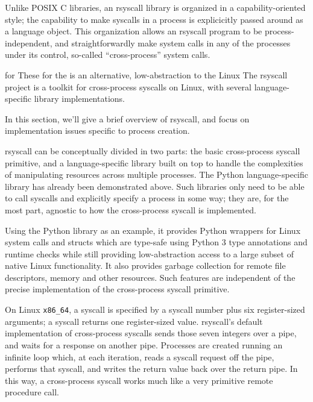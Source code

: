 \documentclass[sigplan]{acmart}
\begin{document}
Unlike POSIX C libraries, an rsyscall library is organized in a capability-oriented style;
the capability to make syscalls in a process is explicicitly passed around as a language object.
This organization allows an rsyscall program to be process-independent,
and straightforwardly make system calls in any of the processes under its control,
so-called ``cross-process'' system calls.

for 
These 
for the is an alternative, low-abstraction to the Linux
The rsyscall project is a toolkit for cross-process syscalls on Linux,
with several language-specific library implementations.

In this section, we'll give a brief overview of rsyscall,
and focus on implementation issues specific to process creation.

rsyscall can be conceptually divided in two parts:
the basic cross-process syscall primitive,
and a language-specific library built on top
to handle the complexities of manipulating resources across multiple processes.
The Python language-specific library has already been demonstrated above.
Such libraries only need to be able to call syscalls and explicitly specify a process in some way;
they are, for the most part, agnostic to how the cross-process syscall is implemented.

Using the Python library as an example,
it provides Python wrappers for Linux system calls and structs
which are type-safe using Python 3 type annotations and runtime checks
while still providing low-abstraction access to a large subset of native Linux functionality.
It also provides garbage collection for remote file descriptors, memory and other resources.
Such features are independent of the precise implementation of the cross-process syscall primitive.

On Linux \verb|x86_64|, a syscall is specified by a syscall number plus six register-sized arguments;
a syscall returns one register-sized value.
rsyscall's default implementation of cross-process syscalls sends those seven integers over a pipe,
and waits for a response on another pipe.
Processes are created running an infinite loop which, at each iteration,
reads a syscall request off the pipe,
performs that syscall,
and writes the return value back over the return pipe.
In this way, a cross-process syscall works much like a very primitive remote procedure call.
\end{document}
